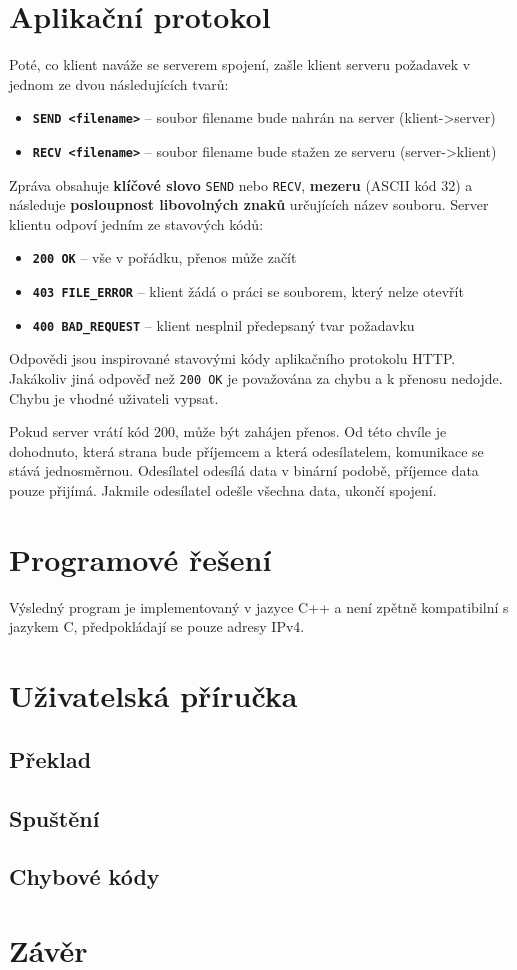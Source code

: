 \documentclass[11pt,a4paper]{article}
\begin{document}
\section{Aplikační protokol}
Poté, co klient naváže se serverem spojení, zašle klient serveru požadavek v jednom ze dvou následujících tvarů:
\begin{itemize}
\item \texttt{\textbf{SEND <filename>}} -- soubor filename bude nahrán na server (klient->server)
\item \texttt{\textbf{RECV <filename>}} -- soubor filename bude stažen ze serveru (server->klient)
\end{itemize}
Zpráva obsahuje \textbf{klíčové slovo} \texttt{SEND} nebo \texttt{RECV}, \textbf{mezeru} (ASCII kód 32) a následuje \textbf{posloupnost libovolných znaků} určujících název souboru. Server klientu odpoví jedním ze stavových kódů:
\begin{itemize}
\item \texttt{\textbf{200 OK}} -- vše v pořádku, přenos může začít
\item \texttt{\textbf{403 FILE\_ERROR}} -- klient žádá o práci se souborem, který nelze otevřít
\item \texttt{\textbf{400 BAD\_REQUEST}} -- klient nesplnil předepsaný tvar požadavku
\end{itemize}
Odpovědi jsou inspirované stavovými kódy aplikačního protokolu HTTP. Jakákoliv jiná odpověď než \texttt{200 OK} je považována za chybu a k přenosu nedojde. Chybu je vhodné uživateli vypsat.

Pokud server vrátí kód 200, může být zahájen přenos. Od této chvíle je dohodnuto, která strana bude příjemcem a která odesílatelem, komunikace se stává jednosměrnou. Odesílatel odesílá data v binární podobě, příjemce data pouze přijímá. Jakmile odesílatel odešle všechna data, ukončí spojení.

\section{Programové řešení}
Výsledný program je implementovaný v jazyce C++ a není zpětně kompatibilní s jazykem C, předpokládají se pouze adresy IPv4.

\section{Uživatelská příručka}
\subsection{Překlad}
\subsection{Spuštění}
\subsection{Chybové kódy}

\section{Závěr}
\end{document}
